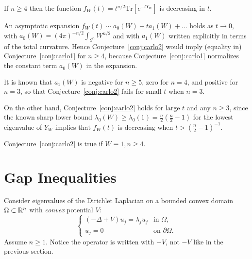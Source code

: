 \documentclass[12pt,letterpaper, reqno]{amsart}
\begin{document}
\begin{problemblock}

\begin{conjecture} \label{conj:carlo2}
 If $n \geq 4$ then the
function $f_W(t) = t^{n/2} \text{Tr}[e^{-tY_W}]$ is decreasing in
$t$.
\end{conjecture}


\begin{remark}
An asymptotic expansion $f_W(t) \sim a_0(W)+ t a_1(W)+\ldots$ holds
as $t \to 0$, with $a_0(W)= (4\pi)^{-n/2} \int_{S^n} W^{n/2}$ and
with $a_1(W)$ written explicitly in terms of the total curvature.
Hence Conjecture~\ref{conj:carlo2} would imply (equality in) Conjecture~\ref{conj:carlo1} for $n
\geq 4$, because Conjecture~\ref{conj:carlo1} normalizes the constant term $a_0(W)$
in the expansion.
\end{remark}

\begin{remark}
It is known that $a_1(W)$ is negative for $n \geq 5$, zero for
$n=4$, and positive for $n=3$, so that Conjecture~\ref{conj:carlo2} fails for small
$t$ when $n=3$.

On the other hand, Conjecture~\ref{conj:carlo2} holds for large $t$ and any $n \geq
3$, since the known sharp lower bound $\lambda_0(W) \geq
\lambda_0(1)= \frac{n}{2} \left( \frac{n}{2}-1 \right)$ for the
lowest eigenvalue of $Y_W$ implies that $f_W(t)$ is decreasing when
$t > \left( \frac{n}{2}-1 \right)^{-1}$.
\end{remark}

\begin{remark}
Conjecture~\ref{conj:carlo2} is true if $W \equiv 1, n \geq 4$.
\end{remark}


\end{problemblock}

\section{ Gap Inequalities}

 Consider eigenvalues of the
Dirichlet Laplacian on a bounded convex domain $\Omega \subset \mathbb R^n$
with \emph{convex} potential $V$:
\[
\begin{cases}
(-\Delta + V) u_j = \lambda_j u_j  & \text{in $\Omega$,} \\
u_j = 0 & \text{on $\partial \Omega$.}
\end{cases}
\]
Assume $n \geq 1$. Notice the operator is written with $+V$, not
$-V$ like in the previous section.
\end{document}
